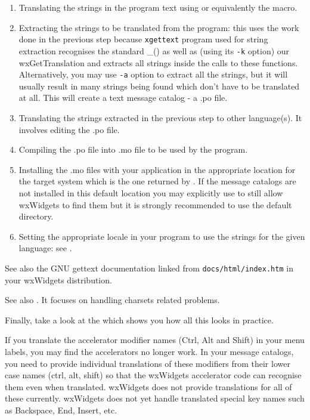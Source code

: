 \begin{enumerate}\itemsep=0pt
\item Translating the strings in the program text using 
 or equivalently the 
 macro.
\item Extracting the strings to be translated from the program: this uses the
work done in the previous step because {\tt xgettext} program used for string
extraction recognises the standard \_() as well as (using its {\tt -k} option)
our wxGetTranslation and extracts all strings inside the calls to these
functions. Alternatively, you may use {\tt -a} option to extract all the
strings, but it will usually result in many strings being found which don't
have to be translated at all. This will create a text message catalog - a .po
file.
\item Translating the strings extracted in the previous step to other
language(s). It involves editing the .po file.
\item Compiling the .po file into .mo file to be used by the program.
\item Installing the .mo files with your application in the appropriate
location for the target system which is the one returned by 
.
If the message catalogs are not installed in this default location you may
explicitly use  to
still allow wxWidgets to find them but it is strongly recommended to use the
default directory.
\item Setting the appropriate locale in your program to use the strings for the
given language: see .
\end{enumerate}

See also the GNU gettext documentation linked from {\tt docs/html/index.htm} in
your wxWidgets distribution.

See also .
It focuses on handling charsets related problems.

Finally, take a look at the  which shows
you how all this looks in practice.


If you translate the accelerator modifier names (Ctrl, Alt and Shift) in your menu labels, you may find
the accelerators no longer work. In your message catalogs, you need to provide individual translations
of these modifiers from their lower case names (ctrl, alt, shift) so that the wxWidgets accelerator
code can recognise them even when translated. wxWidgets does not provide translations for all of these
currently. wxWidgets does not yet handle translated special key names such as Backspace,
End, Insert, etc.

